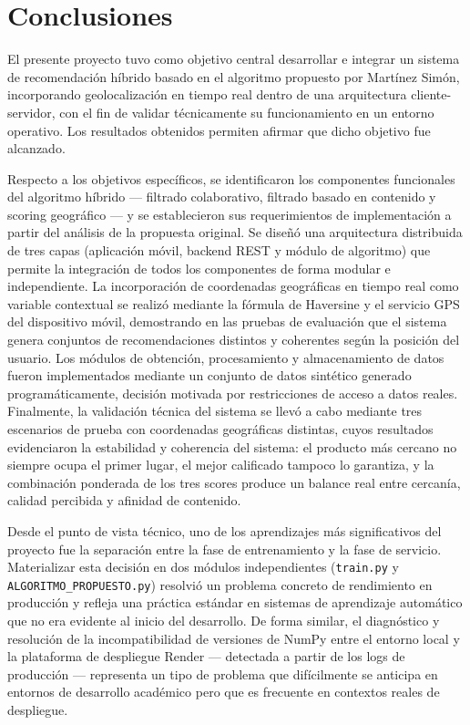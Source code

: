 \documentclass[11pt, letterpaper]{article}
\begin{document}
	\section{Conclusiones}
	
	El presente proyecto tuvo como objetivo central desarrollar e integrar un
	sistema de recomendación híbrido basado en el algoritmo propuesto por
	Martínez Simón, incorporando geolocalización en tiempo real dentro de una
	arquitectura cliente-servidor, con el fin de validar técnicamente su
	funcionamiento en un entorno operativo. Los resultados obtenidos permiten
	afirmar que dicho objetivo fue alcanzado.
	
	Respecto a los objetivos específicos, se identificaron los componentes
	funcionales del algoritmo híbrido — filtrado colaborativo, filtrado basado
	en contenido y scoring geográfico — y se establecieron sus requerimientos
	de implementación a partir del análisis de la propuesta original. Se diseñó
	una arquitectura distribuida de tres capas (aplicación móvil, backend REST
	y módulo de algoritmo) que permite la integración de todos los componentes
	de forma modular e independiente. La incorporación de coordenadas geográficas
	en tiempo real como variable contextual se realizó mediante la fórmula de
	Haversine y el servicio GPS del dispositivo móvil, demostrando en las
	pruebas de evaluación que el sistema genera conjuntos de recomendaciones
	distintos y coherentes según la posición del usuario. Los módulos de
	obtención, procesamiento y almacenamiento de datos fueron implementados
	mediante un conjunto de datos sintético generado programáticamente, decisión
	motivada por restricciones de acceso a datos reales. Finalmente, la
	validación técnica del sistema se llevó a cabo mediante tres escenarios de
	prueba con coordenadas geográficas distintas, cuyos resultados evidenciaron
	la estabilidad y coherencia del sistema: el producto más cercano no siempre
	ocupa el primer lugar, el mejor calificado tampoco lo garantiza, y la
	combinación ponderada de los tres scores produce un balance real entre
	cercanía, calidad percibida y afinidad de contenido.
	
	Desde el punto de vista técnico, uno de los aprendizajes más significativos
	del proyecto fue la separación entre la fase de entrenamiento y la fase de
	servicio. Materializar esta decisión en dos módulos independientes
	(\texttt{train.py} y \texttt{ALGORITMO\_PROPUESTO.py}) resolvió un
	problema concreto de rendimiento en producción y refleja una práctica
	estándar en sistemas de aprendizaje automático que no era evidente al
	inicio del desarrollo. De forma similar, el diagnóstico y resolución de la
	incompatibilidad de versiones de NumPy entre el entorno local y la
	plataforma de despliegue Render — detectada a partir de los logs de
	producción — representa un tipo de problema que difícilmente se anticipa
	en entornos de desarrollo académico pero que es frecuente en contextos
	reales de despliegue.
	
\end{document}
